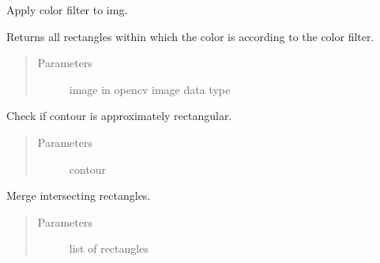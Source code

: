 \documentclass[letterpaper,10pt,english]{sphinxmanual}
\begin{document}

\begin{fulllineitems}
\label{\detokenize{api:color_filter2.color_filter}}
Apply color filter to img.

Returns all rectangles within which the color is according to the
color filter.
\begin{quote}\begin{description}
\item[{Parameters}] \leavevmode
{} \textendash{} image in opencv image data type

\end{description}\end{quote}

\end{fulllineitems}


\begin{fulllineitems}
\label{\detokenize{api:color_filter2.is_rect_shape}}
Check if contour is approximately rectangular.
\begin{quote}\begin{description}
\item[{Parameters}] \leavevmode
{} \textendash{} contour

\end{description}\end{quote}

\end{fulllineitems}


\begin{fulllineitems}
\label{\detokenize{api:color_filter2.merge_rects}}
Merge intersecting rectangles.
\begin{quote}\begin{description}
\item[{Parameters}] \leavevmode
{} \textendash{} list of rectangles

\end{description}\end{quote}

\end{fulllineitems}
\end{document}
